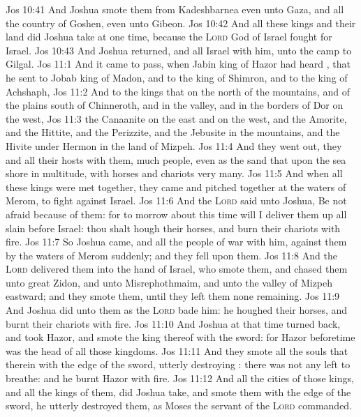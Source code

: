 \vs Jos 10:41 And Joshua smote them from Kadeshbarnea even unto Gaza, and all the country of Goshen, even unto Gibeon.
\vs Jos 10:42 And all these kings and their land did Joshua take at one time, because the \textsc{Lord} God of Israel fought for Israel.
\vs Jos 10:43 And Joshua returned, and all Israel with him, unto the camp to Gilgal.
\vs Jos 11:1 And it came to pass, when Jabin king of Hazor had heard , that he sent to Jobab king of Madon, and to the king of Shimron, and to the king of Achshaph,
\vs Jos 11:2 And to the kings that  on the north of the mountains, and of the plains south of Chinneroth, and in the valley, and in the borders of Dor on the west,
\vs Jos 11:3  the Canaanite on the east and on the west, and  the Amorite, and the Hittite, and the Perizzite, and the Jebusite in the mountains, and  the Hivite under Hermon in the land of Mizpeh.
\vs Jos 11:4 And they went out, they and all their hosts with them, much people, even as the sand that  upon the sea shore in multitude, with horses and chariots very many.
\vs Jos 11:5 And when all these kings were met together, they came and pitched together at the waters of Merom, to fight against Israel.
\vs Jos 11:6 And the \textsc{Lord} said unto Joshua, Be not afraid because of them: for to morrow about this time will I deliver them up all slain before Israel: thou shalt hough their horses, and burn their chariots with fire.
\vs Jos 11:7 So Joshua came, and all the people of war with him, against them by the waters of Merom suddenly; and they fell upon them.
\vs Jos 11:8 And the \textsc{Lord} delivered them into the hand of Israel, who smote them, and chased them unto great Zidon, and unto Misrephothmaim, and unto the valley of Mizpeh eastward; and they smote them, until they left them none remaining.
\vs Jos 11:9 And Joshua did unto them as the \textsc{Lord} bade him: he houghed their horses, and burnt their chariots with fire.
\vs Jos 11:10 And Joshua at that time turned back, and took Hazor, and smote the king thereof with the sword: for Hazor beforetime was the head of all those kingdoms.
\vs Jos 11:11 And they smote all the souls that  therein with the edge of the sword, utterly destroying : there was not any left to breathe: and he burnt Hazor with fire.
\vs Jos 11:12 And all the cities of those kings, and all the kings of them, did Joshua take, and smote them with the edge of the sword,  he utterly destroyed them, as Moses the servant of the \textsc{Lord} commanded.
